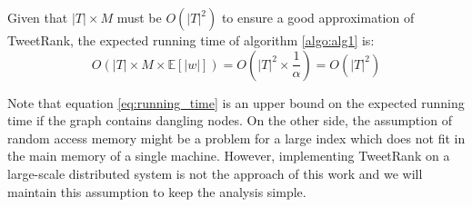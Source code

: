 Given that $|T| \times M$ must be $O(|T|^ 2)$ to ensure a good approximation of TweetRank, the expected running time of algorithm \ref{algo:alg1} is:
\begin{equation}\label{eq:running_time}
O(|T| \times M \times \mathbb{E}[|w|]) = O(|T|^2 \times \frac{1}{\alpha}) = O(|T|^2)
\end{equation}

Note that equation \ref{eq:running_time} is an upper bound on the expected running time if the graph contains dangling nodes. On the other side, the assumption of random access memory might be a problem for a large index which does not fit in the main memory of a single machine. However, implementing TweetRank on a large-scale distributed system is not the approach of this work and we will maintain this assumption to keep the analysis simple.